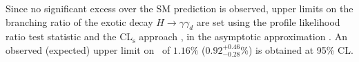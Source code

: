 
Since no significant excess over the SM prediction is observed, upper limits on the branching ratio of the exotic decay $H\to\gamma\gamma_d$ are set using the profile likelihood ratio test statistic and the CL$_\text{s}$ approach \cite{Read:2002hq}, in the asymptotic approximation \cite{Cowan:2010js}. An observed (expected) upper limit on \br\ of $1.16\%$ ($0.92^{+0.46}_{-0.28}\%$) is obtained at 95\% CL.